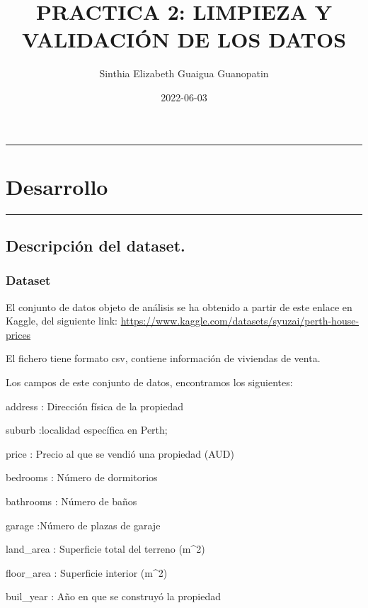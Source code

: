 \documentclass[
]{article}
\title{PRACTICA 2: LIMPIEZA Y VALIDACIÓN DE LOS DATOS}
\author{Sinthia Elizabeth Guaigua Guanopatin}
\date{2022-06-03}
\begin{document}
\maketitle

{
\setcounter{tocdepth}{2}
\tableofcontents
}
\begin{center}\rule{0.5\linewidth}{0.5pt}\end{center}

\hypertarget{desarrollo}{%
\section{Desarrollo}\label{desarrollo}}

\begin{center}\rule{0.5\linewidth}{0.5pt}\end{center}

\hypertarget{descripciuxf3n-del-dataset.}{%
\subsection{Descripción del
dataset.}\label{descripciuxf3n-del-dataset.}}

\hypertarget{dataset}{%
\subsubsection{Dataset}\label{dataset}}

El conjunto de datos objeto de análisis se ha obtenido a partir de este
enlace en Kaggle, del siguiente link:
\url{https://www.kaggle.com/datasets/syuzai/perth-house-prices}

El fichero tiene formato csv, contiene información de viviendas de
venta.

Los campos de este conjunto de datos, encontramos los siguientes:

address : Dirección física de la propiedad

suburb :localidad específica en Perth;

price : Precio al que se vendió una propiedad (AUD)

bedrooms : Número de dormitorios

bathrooms : Número de baños

garage :Número de plazas de garaje

land\_area : Superficie total del terreno (m\^{}2)

floor\_area : Superficie interior (m\^{}2)

buil\_year : Año en que se construyó la propiedad
\end{document}
